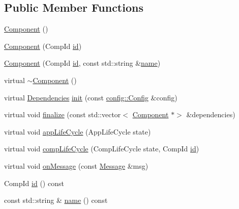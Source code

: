 \subsection*{Public Member Functions}
\begin{DoxyCompactItemize}
\item 
\hyperlink{classtheoria_1_1core_1_1Component_a8775db6d1a2c1afc2e77cd3c8f39da6f}{Component} ()
\item 
\hyperlink{classtheoria_1_1core_1_1Component_a64b1e60585ad8c0d12d9be814b37dda8}{Component} (Comp\+Id \hyperlink{classtheoria_1_1core_1_1Component_ab539df9f996efceda7743fa1b69cd25d}{id})
\item 
\hyperlink{classtheoria_1_1core_1_1Component_a719767a45a12a3d12670aadd83f5d292}{Component} (Comp\+Id \hyperlink{classtheoria_1_1core_1_1Component_ab539df9f996efceda7743fa1b69cd25d}{id}, const std\+::string \&\hyperlink{classtheoria_1_1core_1_1Component_ae0a32f194c007fe419ec9ae9303025fc}{name})
\item 
virtual \hyperlink{classtheoria_1_1core_1_1Component_ab8378fa275af98e568a7e91d33d867af}{$\sim$\+Component} ()
\item 
virtual \hyperlink{classtheoria_1_1core_1_1Dependencies}{Dependencies} \hyperlink{classtheoria_1_1core_1_1Component_a7ed45f6e38442a40666ae4556f794f7d}{init} (const \hyperlink{classtheoria_1_1config_1_1Config}{config\+::\+Config} \&config)
\item 
virtual void \hyperlink{classtheoria_1_1core_1_1Component_afd8acc89e2cd36e92bebe7e6fa530764}{finalize} (const std\+::vector$<$ \hyperlink{classtheoria_1_1core_1_1Component}{Component} $\ast$$>$ \&dependencies)
\item 
virtual void \hyperlink{classtheoria_1_1core_1_1Component_ae036cde9b803a621149efeff7e0e00fc}{app\+Life\+Cycle} (App\+Life\+Cycle state)
\item 
virtual void \hyperlink{classtheoria_1_1core_1_1Component_a92578e2b6253681a21b91e7c22b22975}{comp\+Life\+Cycle} (Comp\+Life\+Cycle state, Comp\+Id \hyperlink{classtheoria_1_1core_1_1Component_ab539df9f996efceda7743fa1b69cd25d}{id})
\item 
virtual void \hyperlink{classtheoria_1_1core_1_1Component_a6b6d003ecdddc3eee401917f01ae7a1d}{on\+Message} (const \hyperlink{classtheoria_1_1core_1_1Message}{Message} \&msg)
\item 
Comp\+Id \hyperlink{classtheoria_1_1core_1_1Component_ab539df9f996efceda7743fa1b69cd25d}{id} () const
\item 
const std\+::string \& \hyperlink{classtheoria_1_1core_1_1Component_ae0a32f194c007fe419ec9ae9303025fc}{name} () const
$$
\end{DoxyCompactItemize}
